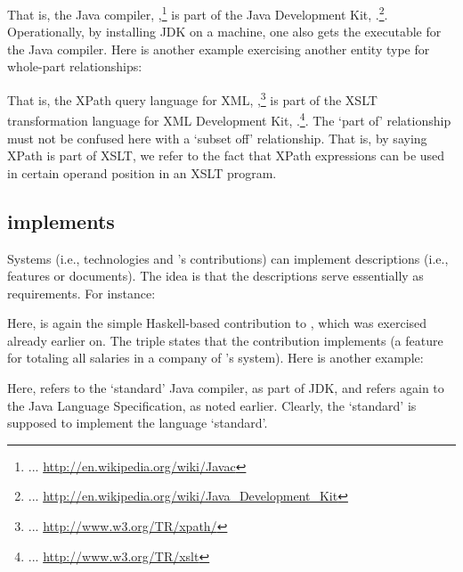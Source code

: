 
\noindent
That is, the Java compiler,
,\footnote{... 
  \url{http://en.wikipedia.org/wiki/Javac}} is part of the Java
Development Kit, .\footnote{... 
  \url{http://en.wikipedia.org/wiki/Java_Development_Kit}}. Operationally,
by installing JDK on a machine, one also gets the executable for the
Java compiler. Here is another example exercising another entity type
for whole-part relationships:


\noindent
That is, the XPath query language for XML,
,\footnote{... 
  \url{http://www.w3.org/TR/xpath/}} is part of the XSLT
transformation language for XML
Development Kit, .\footnote{... 
  \url{http://www.w3.org/TR/xslt}}. The `part of' relationship must not
be confused here with a `subset off' relationship. That is, by saying
XPath is part of XSLT, we refer to the fact that XPath expressions can
be used in certain operand position in an XSLT program. 


\subsection{implements}

Systems (i.e., technologies and \ooo{}'s contributions) can implement
descriptions (i.e., features or documents). The idea is that the
descriptions serve essentially as requirements. For instance:


\noindent
Here,  is again the simple Haskell-based
contribution to \ooo{}, which was exercised already earlier on. The
triple states that the contribution implements  (a
feature for totaling all salaries in a company of \ooo{}'s
system). Here is another example:


\noindent
Here,  refers to the `standard' Java compiler, as part
of JDK, and  refers again to the Java Language
Specification, as noted earlier. Clearly, the `standard' is supposed
to implement the language `standard'.


